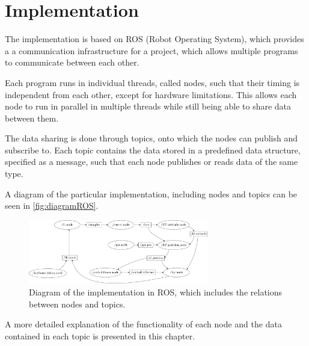 \chapter{Implementation}
The implementation is based on ROS (Robot Operating System), which provides a a communication infrastructure for a project, which allows multiple programs to communicate between each other. 

Each program runs in individual threads, called nodes, such that their timing is independent from each other, except for hardware limitations. This allows each node to run in parallel in multiple threads while still being able to share data between them.

The data sharing is done through topics, onto which the nodes can publish and subscribe to. Each topic contains the data stored in a predefined data structure, specified as a message, such that each node publishes or reads data of the same type.

A diagram of the particular implementation, including nodes and topics can be seen in \autoref{fig:diagramROS}.

\begin{figure}[H]
    \includegraphics[width=0.7\textwidth]{figures/diagramROS}
    \caption{Diagram of the implementation in ROS, which includes the relations between nodes and topics.}
    \label{fig:diagramROS}
\end{figure}

A more detailed explanation of the functionality of each node and the data contained in each topic is presented in this chapter.


